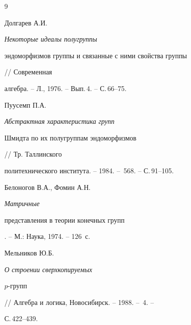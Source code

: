 \begin{thebibliography}{9}







Долгарев А.И. {\em Некоторые идеалы полугруппы


эндоморфизмов группы и связанные с ними свойства группы} // Современная


алгебра. -- Л., 1976. -- Вып.\,4. -- С.\,66--75.




Пуусемп П.А. {\em Абстрактная характеристика групп


Шмидта по их полугруппам эндоморфизмов} // Тр. Таллинского


политехнического института. -- 1984. -- \No\,568. -- С.\,91--105.




Белоногов В.А., Фомин А.Н. {\em Матричные


представления в теории конечных групп}. -- М.: Наука, 1974. -- 126~с.




Мельников Ю.Б. {\em О строении сверхкопируемых


$p$-групп} // Алгебра и логика, Новосибирск. -- 1988. -- \No\,4. --


С.\,422--439.





\end{thebibliography}





\vskip 2cm














\label{end}








